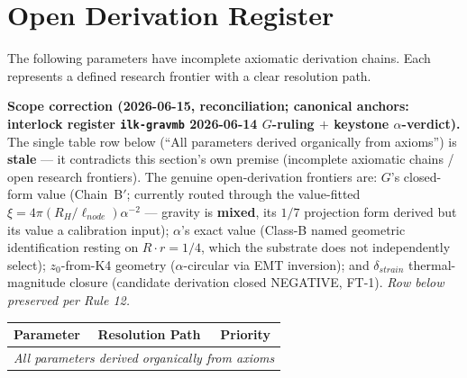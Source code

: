 \section{Open Derivation Register}
\label{sec:open_derivations}

The following parameters have incomplete axiomatic derivation chains. Each represents a defined research frontier with a clear resolution path.

\textbf{Scope correction (2026-06-15, reconciliation; canonical anchors: interlock register \texttt{ilk-gravmb} 2026-06-14 $G$-ruling $+$ keystone $\alpha$-verdict).} The single table row below (``All parameters derived organically from axioms'') is \textbf{stale} --- it contradicts this section's own premise (incomplete axiomatic chains / open research frontiers). The genuine open-derivation frontiers are: $G$'s closed-form value (Chain~B$'$; currently routed through the value-fitted $\xi = 4\pi(R_H/\ell_{node})\alpha^{-2}$ --- gravity is \textbf{mixed}, its $1/7$ projection form derived but its value a calibration input); $\alpha$'s exact value (Class-B named geometric identification resting on $R \cdot r = 1/4$, which the substrate does not independently select); $z_0$-from-K4 geometry ($\alpha$-circular via EMT inversion); and $\delta_{strain}$ thermal-magnitude closure (candidate derivation closed NEGATIVE, FT-1). \textit{Row below preserved per Rule 12.}

\begin{center}
\small
\begin{tabular}{l l l}
\hline\hline
\textbf{Parameter} & \textbf{Resolution Path} & \textbf{Priority} \\
\hline
\multicolumn{3}{c}{\textit{All parameters derived organically from axioms}} \\
\hline\hline
\end{tabular}
\end{center}
